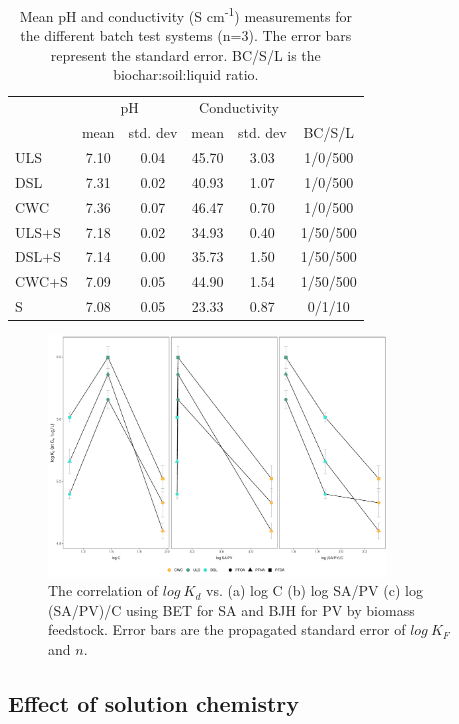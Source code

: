 \begin{table}
\centering
\caption{Mean pH and conductivity (\textmu S cm\textsuperscript{-1}) measurements for the different batch test systems (n=3). The error bars represent the standard error. BC/S/L is the biochar:soil:liquid ratio.}
\label{tab:pHcond}
\begin{tabular}{lccccc}
\toprule
 & \multicolumn{2}{c}{pH} & \multicolumn{2}{c}{Conductivity} & \\ \cline{2-5}
 & mean & std. dev & mean & std. dev & BC/S/L\\ 
\midrule
ULS & 7.10 & 0.04 & 45.70 & 3.03 & 1/0/500\\
DSL & 7.31 & 0.02 & 40.93 & 1.07 & 1/0/500\\
CWC & 7.36 & 0.07 & 46.47 & 0.70 & 1/0/500\\
ULS+S & 7.18 & 0.02 & 34.93 & 0.40 & 1/50/500\\
DSL+S & 7.14 & 0.00 & 35.73 & 1.50 & 1/50/500\\
CWC+S & 7.09 & 0.05 & 44.90 & 1.54 & 1/50/500\\
S & 7.08 & 0.05 & 23.33 & 0.87 & 0/1/10\\
\bottomrule
\end{tabular}
\end{table}

\begin{figure}[htb]
    \centering
    \includegraphics[width=0.8\textwidth]{R/figs/SAPV_C_Kd1ugL_plot.pdf}
    \caption{The correlation of $log~K_d$ vs. (a) log C (b) log SA/PV (c) log (SA/PV)/C using BET for SA and BJH for PV by biomass feedstock. Error bars are the propagated standard error of $log~K_F$ and $n$.}
    \label{fig:Kd_SAPV_C}
\end{figure}


\subsection{Effect of solution chemistry}

